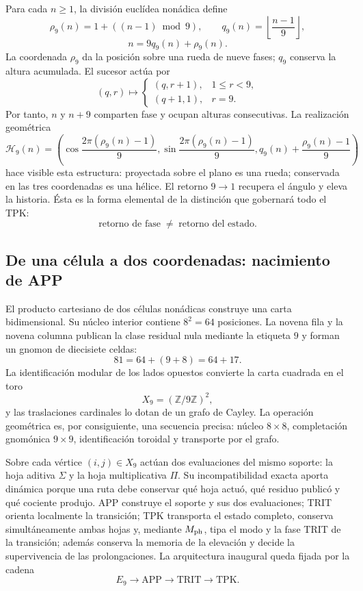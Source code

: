 Para cada \(n\ge1\), la división euclídea nonádica define
\[
 \rho_9(n)=1+((n-1)\bmod9),
 \qquad
 q_9(n)=\left\lfloor\frac{n-1}{9}\right\rfloor,
\]
\begin{equation}
 n=9q_9(n)+\rho_9(n).
 \label{eq:rueda-helice-nonadica-revfinal}
\end{equation}
La coordenada \(\rho_9\) da la posición sobre una rueda de nueve fases;
\(q_9\) conserva la altura acumulada. El sucesor actúa por
\[
 (q,r)\longmapsto
 \begin{cases}
 (q,r+1),&1\le r<9,\\
 (q+1,1),&r=9.
 \end{cases}
\]
Por tanto, \(n\) y \(n+9\) comparten fase y ocupan alturas consecutivas. La
realización geométrica
\[
 \mathcal H_9(n)=
 \left(
  \cos\frac{2\pi(\rho_9(n)-1)}9,
  \sin\frac{2\pi(\rho_9(n)-1)}9,
  q_9(n)+\frac{\rho_9(n)-1}{9}
 \right)
\]
hace visible esta estructura: proyectada sobre el plano es una rueda;
conservada en las tres coordenadas es una hélice. El retorno \(9\to1\)
recupera el ángulo y eleva la historia. Ésta es la forma elemental de la
distinción que gobernará todo el TPK:
\[
 \boxed{\text{retorno de fase}\;\neq\;\text{retorno del estado}.}
\]

\subsection{De una célula a dos coordenadas: nacimiento de APP}

El producto cartesiano de dos células nonádicas construye una carta
bidimensional. Su núcleo interior contiene \(8^2=64\) posiciones. La novena
fila y la novena columna publican la clase residual nula mediante la etiqueta
\(9\) y forman un gnomon de diecisiete celdas:
\[
 81=64+(9+8)=64+17.
\]
La identificación modular de los lados opuestos convierte la carta cuadrada
en el toro
\[
 X_9=(\mathbb Z/9\mathbb Z)^2,
\]
y las traslaciones cardinales lo dotan de un grafo de Cayley. La operación
geométrica es, por consiguiente, una secuencia precisa: núcleo
\(8\times8\), completación gnomónica \(9\times9\), identificación toroidal y
transporte por el grafo.

Sobre cada vértice \((i,j)\in X_9\) actúan dos evaluaciones del mismo soporte:
la hoja aditiva \(\Sigma\) y la hoja multiplicativa \(\Pi\). Su
incompatibilidad exacta aporta dinámica porque una ruta debe conservar qué
hoja actuó, qué residuo publicó y qué cociente produjo. APP construye el
soporte y sus dos evaluaciones; TRIT orienta localmente la transición; TPK
transporta el estado completo, conserva simultáneamente ambas hojas y, mediante
\(M_{\rm ph}\), tipa el modo y la fase TRIT de la transición; además conserva la
memoria de la elevación y decide la supervivencia de las prolongaciones. La
arquitectura inaugural queda fijada por la cadena
\[
 \boxed{
 E_9\longrightarrow
 \mathrm{APP}\longrightarrow
 \mathrm{TRIT}\longrightarrow
 \mathrm{TPK}.}
\]

